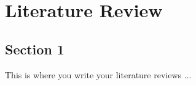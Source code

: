 \chapter{Literature Review}  %

\section{Section 1} %

This is where you write your literature reviews ...

